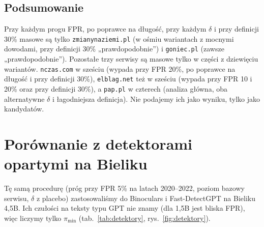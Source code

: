 \documentclass[11pt,a4paper]{article}
\newcommand{\pimin}{\ensuremath{\pi_{\mathrm{min}}}}
\newcommand{\dom}[1]{\texttt{#1}}
\begin{document}
\subsection{Podsumowanie}\label{sec:podsumowanie}

Przy każdym progu FPR, po poprawce na długość, przy każdym $\delta$ i przy definicji 30\% masowe są tylko \dom{zmianynaziemi.pl} (w ośmiu wariantach z mocnymi dowodami, przy definicji 30\% „prawdopodobnie”) i \dom{goniec.pl} (zawsze „prawdopodobnie”). Pozostałe trzy serwisy są masowe tylko w części z dziewięciu wariantów. \dom{nczas.com} w sześciu (wypada przy FPR 20\%, po poprawce na długość i przy definicji 30\%), \dom{elblag.net} też w sześciu (wypada przy FPR 10 i 20\% oraz przy definicji 30\%), a \dom{pap.pl} w czterech (analiza główna, oba alternatywne $\delta$ i łagodniejsza definicja). Nie podajemy ich jako wyniku, tylko jako kandydatów.

\section{Porównanie z detektorami opartymi na Bieliku}

Tę samą procedurę (próg przy FPR 5\% na latach 2020--2022, poziom bazowy serwisu, $\delta$ z placebo) zastosowaliśmy do Binoculars i Fast-DetectGPT na Bieliku 4,5B. Ich czułości na teksty typu GPT nie znamy (dla 1,5B jest bliska FPR), więc liczymy tylko \pimin{} (tab.~\ref{tab:detektory}, rys.~\ref{fig:detektory}).
\end{document}
